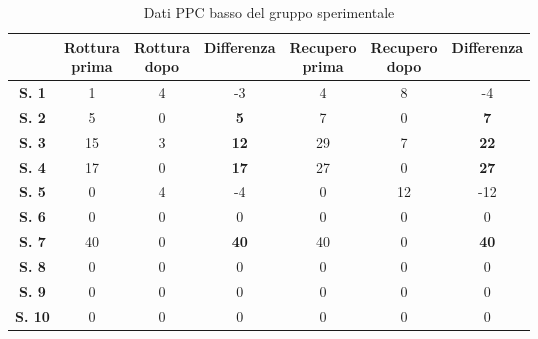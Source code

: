 \begin{table}[H]
\begin{center}
\begin{tabular}{|c|c|c|c|c|c|c|} \hline
{\textbf{}} & \pbox{20cm}{\textbf{Rottura} \\ \textbf{prima}} & \pbox{20cm}{\textbf{Rottura} \\ \textbf{dopo}} & \textbf{Differenza} & \pbox{20cm}{\textbf{Recupero} \\ \textbf{prima}} & \pbox{20cm}{\textbf{Recupero} \\ \textbf{dopo}} & \textbf{Differenza} \\ \hline
\textbf{S. 1} & 1 & 4 & -3 & 4 & 8 & -4 \\ \hline
\textbf{S. 2} & 5 & 0 & \textbf{5} & 7 & 0 & \textbf{7} \\ \hline
\textbf{S. 3} & 15 & 3 & \textbf{12} & 29 & 7 & \textbf{22}  \\ \hline
\textbf{S. 4} & 17 & 0 & \textbf{17} & 27 & 0 & \textbf{27}  \\ \hline
\textbf{S. 5} & 0 & 4 & -4 & 0 & 12 & -12  \\ \hline
\textbf{S. 6} & 0 & 0 & 0 & 0 & 0 & 0 \\ \hline
\textbf{S. 7} & 40 & 0 & \textbf{40} & 40 & 0 & \textbf{40} \\ \hline
\textbf{S. 8} & 0 & 0 & 0 & 0 & 0 & 0 \\ \hline
\textbf{S. 9} & 0 & 0 & 0 & 0 & 0 & 0 \\ \hline
\textbf{S. 10} & 0 & 0 & 0 & 0 & 0 & 0 \\ \hline

\end{tabular}
\end{center}
\caption{Dati PPC basso del gruppo sperimentale}
\end{table}
\\\ \\\ \\\ \\\ \\\ \\\ \\\ \\\ \\\ \\\ \\\ 

